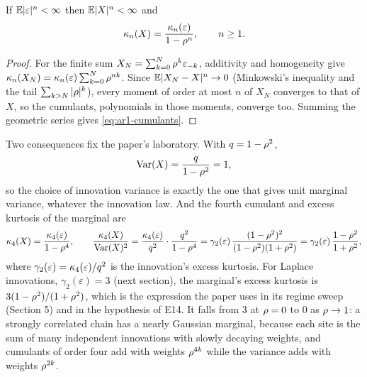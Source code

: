 \begin{proposition}
\label{prop:ar1-cumulants}
If $\mathbb{E}|\varepsilon|^n<\infty$ then $\mathbb{E}|X|^n<\infty$ and
\begin{equation}
  \kappa_n(X)=\frac{\kappa_n(\varepsilon)}{1-\rho^n},\qquad n\ge1.
  \label{eq:ar1-cumulants}
\end{equation}
\end{proposition}
\begin{proof}
For the finite sum $X_N=\sum_{k=0}^N\rho^k\varepsilon_{-k}$, additivity and homogeneity
give $\kappa_n(X_N)=\kappa_n(\varepsilon)\sum_{k=0}^N\rho^{nk}$. Since
$\mathbb{E}|X_N-X|^n\to0$ (Minkowski's inequality and the tail $\sum_{k>N}|\rho|^k$), every
moment of order at most $n$ of $X_N$ converges to that of $X$, so the cumulants,
polynomials in those moments, converge too. Summing the geometric series gives
\cref{eq:ar1-cumulants}.
\end{proof}

Two consequences fix the paper's laboratory. With $q=1-\rho^2$,
\begin{equation}
  \operatorname{Var}(X)=\frac{q}{1-\rho^2}=1,
\end{equation}
so the choice of innovation variance is exactly the one that gives unit marginal
variance, whatever the innovation law. And the fourth cumulant and excess kurtosis
of the marginal are
\begin{equation}
  \kappa_4(X)=\frac{\kappa_4(\varepsilon)}{1-\rho^4},\qquad
  \frac{\kappa_4(X)}{\operatorname{Var}(X)^2}=\frac{\kappa_4(\varepsilon)}{q^2}\cdot\frac{q^2}{1-\rho^4}
  =\gamma_2(\varepsilon)\,\frac{(1-\rho^2)^2}{(1-\rho^2)(1+\rho^2)}
  =\gamma_2(\varepsilon)\,\frac{1-\rho^2}{1+\rho^2},
  \label{eq:ar1-kurtosis}
\end{equation}
where $\gamma_2(\varepsilon)=\kappa_4(\varepsilon)/q^2$ is the innovation's excess
kurtosis. For Laplace innovations, $\gamma_2(\varepsilon)=3$ (next section), the
marginal's excess kurtosis is $3(1-\rho^2)/(1+\rho^2)$, which is the expression the
paper uses in its regime sweep (Section 5) and in the hypothesis of E14. It falls from
$3$ at $\rho=0$ to $0$ as $\rho\to1$: a strongly correlated chain has a nearly
Gaussian marginal, because each site is the sum of many independent innovations with
slowly decaying weights, and cumulants of order four add with weights $\rho^{4k}$
while the variance adds with weights $\rho^{2k}$.

